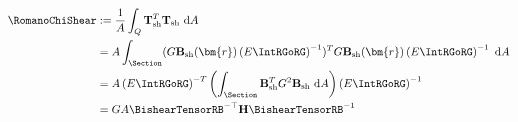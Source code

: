 \begin{equation}
\begin{aligned}
\RomanoChiShear
&:=\frac{1}{A} \int_Q \mathbf{T}_{\rm sh}^T \mathbf{T}_{\rm sh} \mathrm{~d}A\\ 
&= A \int_{\Section} (G \mathbf{B}_{\rm sh}(\bm{r})\left(E \IntRGoRG\right)^{-1})^T G \mathbf{B}_{\rm sh}(\bm{r})\left(E \IntRGoRG\right)^{-1} \mathrm{~d}A\\ 
&= A \left(E \IntRGoRG\right)^{-T} \left(\int_{\Section} \mathbf{B}_{\rm sh}^T
G^2 \mathbf{B}_{\rm sh} \mathrm{~d}A\right) \left(E \IntRGoRG\right)^{-1}\\ 
&= GA \BishearTensorRB^{-\top} \mathbf{H} \BishearTensorRB^{-1}
\end{aligned}
\label{eq:def-romano-chi-shear}
\end{equation}